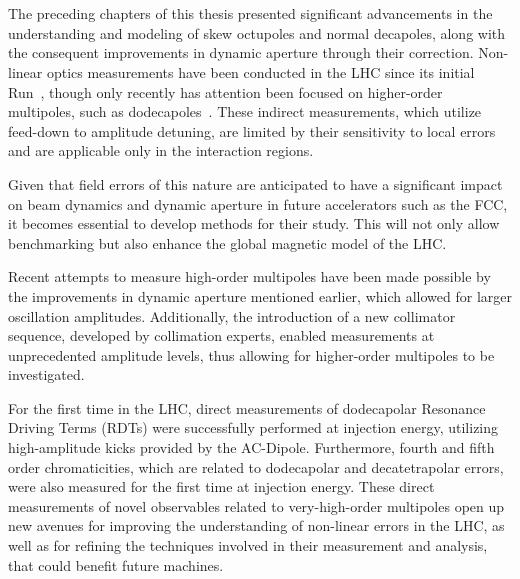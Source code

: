 \section{}

The preceding chapters of this thesis presented significant advancements in the understanding and
modeling of skew octupoles and normal decapoles, along with the consequent improvements in
dynamic aperture through their correction. Non-linear optics measurements have been conducted in the
LHC since its initial Run~\cite{maclean_non-linear_2011, maclean_commissioning_2016-1}, though only
recently has attention been focused on higher-order multipoles, such as
dodecapoles~\cite{dilly_corrections_2022}. These indirect measurements, which utilize
feed-down to amplitude detuning, are limited by their sensitivity to local errors and are applicable
only in the interaction regions.

Given that field errors of this nature are anticipated to have a significant impact on beam dynamics
and dynamic aperture in future accelerators such as the FCC, it becomes essential to develop methods
for their study. This will not only allow benchmarking but also enhance the global magnetic
model of the LHC.

Recent attempts to measure high-order multipoles have been made possible by the improvements in
dynamic aperture mentioned earlier, which allowed for larger oscillation amplitudes. Additionally,
the introduction of a new collimator sequence, developed by collimation experts, enabled
measurements at unprecedented amplitude levels, thus allowing for higher-order multipoles to be
investigated.

For the first time in the LHC, direct measurements of dodecapolar Resonance Driving Terms (RDTs)
were successfully performed at injection energy, utilizing high-amplitude kicks provided by the
AC-Dipole. Furthermore, fourth and fifth order chromaticities, which are related to dodecapolar and
decatetrapolar errors, were also measured for the first time at injection energy. 
These direct measurements of novel observables related to very-high-order multipoles open up new
avenues for improving the understanding of non-linear errors in the LHC, as well as
for refining the techniques involved in their measurement and analysis, that could benefit future
machines.


